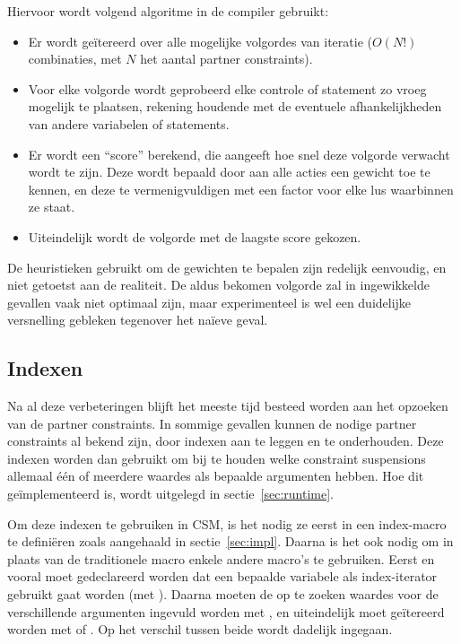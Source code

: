 Hiervoor wordt volgend algoritme in de compiler gebruikt: \begin{itemize}
  \item Er wordt ge\"itereerd over alle mogelijke volgordes van iteratie ($O(N!)$ combinaties, met $N$ het aantal partner constraints).
  \item Voor elke volgorde wordt geprobeerd elke controle of statement zo vroeg mogelijk te plaatsen, rekening houdende met de eventuele afhankelijkheden van andere variabelen of statements.
  \item Er wordt een ``score'' berekend, die aangeeft hoe snel deze volgorde verwacht wordt te zijn. Deze wordt bepaald door aan alle acties een gewicht toe te kennen, en deze te vermenigvuldigen met een factor voor elke lus waarbinnen ze staat.
  \item Uiteindelijk wordt de volgorde met de laagste score gekozen.
\end{itemize}
De heuristieken gebruikt om de gewichten te bepalen zijn redelijk eenvoudig, en niet getoetst aan de realiteit. De aldus bekomen volgorde zal in ingewikkelde gevallen vaak niet optimaal zijn, maar experimenteel is wel een duidelijke versnelling gebleken tegenover het na\"ieve geval.

\subsection{Indexen} \label{gencode-index}


Na al deze verbeteringen blijft het meeste tijd besteed worden aan het opzoeken van de partner constraints. In sommige gevallen kunnen de nodige partner constraints al bekend zijn, door indexen aan te leggen en te onderhouden. Deze indexen worden dan gebruikt om bij te houden welke constraint suspensions allemaal \'e\'en of meerdere waardes als bepaalde argumenten hebben. Hoe dit ge\"implementeerd is, wordt uitgelegd in sectie~\ref{sec:runtime}.

Om deze indexen te gebruiken in CSM, is het nodig ze eerst in een index-macro te defini\"eren zoals aangehaald in sectie~\ref{sec:impl}. Daarna is het ook nodig om in plaats van de traditionele  macro enkele andere macro's te gebruiken. Eerst en vooral moet gedeclareerd worden dat een bepaalde variabele als index-iterator gebruikt gaat worden (met ). Daarna moeten de op te zoeken waardes voor de verschillende argumenten ingevuld worden met , en uiteindelijk moet ge\"itereerd worden met  of . Op het verschil tussen beide wordt dadelijk ingegaan.

